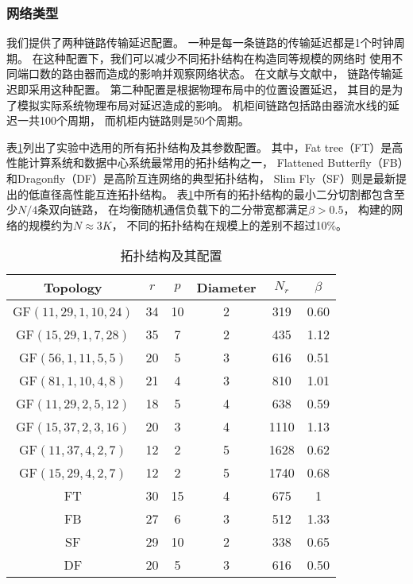 \subsubsection{网络类型}
我们提供了两种链路传输延迟配置。
一种是每一条链路的传输延迟都是1个时钟周期。
在这种配置下，我们可以减少不同拓扑结构在构造同等规模的网络时
使用不同端口数的路由器而造成的影响并观察网络状态。
在文献与文献中，
链路传输延迟即采用这种配置。
第二种配置是根据物理布局中的位置设置延迟，
其目的是为了模拟实际系统物理布局对延迟造成的影响。
机柜间链路包括路由器流水线的延迟一共100个周期，
而机柜内链路则是50个周期。

表\ref{chap3table6}列出了实验中选用的所有拓扑结构及其参数配置。
其中，Fat tree（FT）是高性能计算系统和数据中心系统最常用的拓扑结构之一，
Flattened Butterfly（FB）和Dragonfly（DF）是高阶互连网络的典型拓扑结构，
Slim Fly（SF）则是最新提出的低直径高性能互连拓扑结构。
表\ref{chap3table6}中所有的拓扑结构的最小二分切割都包含至少$N/4$条双向链路，
在均衡随机通信负载下的二分带宽都满足$\beta>0.5$，
构建的网络的规模约为$N\approx 3K$，
不同的拓扑结构在规模上的差别不超过10\%。


\begin{table}[t]
\caption{拓扑结构及其配置}
\centering
\begin{tabular}{cccccc}
  \toprule
  Topology	& $r$ &$p$ & Diameter & $N_r$ 	& $\beta$ \\
  \midrule
  GF$(11,29,1,10,24)$ &34 &10 &2	&319 		&0.60	\\
  GF$(15,29,1,7,28)$ &35 &7 &2	&435 		&1.12 \\
  GF$(56,1,11,5,5)$ &20 &5 &3	&616 		&0.51 \\
  GF$(81,1,10,4,8)$ &21 &4 &3	&810 	&1.01 \\
  GF$(11,29,2,5,12)$ &18 &5 &4	&638 		&0.59 \\
  GF$(15,37,2,3,16)$ &20 &3 &4	&1110 		&1.13 \\
  GF$(11,37,4,2,7)$ &12 &2 &5	&1628 		&0.62 \\
  GF$(15,29,4,2,7)$ &12 &2 &5	&1740 		&0.68 \\
  FT &30 &15 &4	&675		&1	\\
  FB &27 &6	  &3 &512		&1.33 \\
  SF &29 &10 &2	&338		&0.65 \\
  DF &20 &5	&3 &616		&0.50 \\
  \bottomrule
\end{tabular}
  \label{chap3table6}
\end{table}

